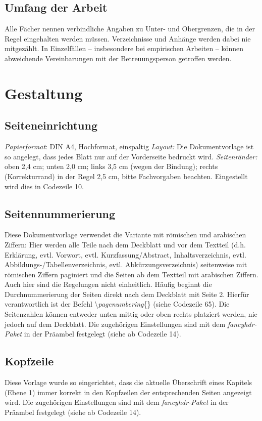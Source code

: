 \documentclass[a4paper,11pt]{article}%
\renewcommand{\\}{\vspace*{0.5\baselineskip} \newline}
\begin{document}
\subsection{Umfang der Arbeit}
Alle Fächer nennen verbindliche Angaben zu Unter- und Obergrenzen, die in der Regel eingehalten werden müssen. Verzeichnisse und Anhänge werden dabei nie mitgezählt. In Einzelfällen – insbesondere bei empirischen Arbeiten – können abweichende Vereinbarungen mit der Betreuungsperson getroffen werden.

\section{Gestaltung}
\subsection{Seiteneinrichtung}
\textit{Papierformat}: DIN A4, Hochformat, einspaltig \\
\textit{Layout:} Die Dokumentvorlage ist so angelegt, dass jedes Blatt nur auf der Vorderseite bedruckt wird. \\
\textit{Seitenränder:} oben 2,4 cm; unten 2,0 cm; links 3,5 cm (wegen der Bindung); rechts (Korrekturrand) in der Regel 2,5 cm, bitte Fachvorgaben beachten. Eingestellt wird dies in Codezeile 10.

\subsection{Seitennummerierung}
Diese Dokumentvorlage verwendet die Variante mit römischen und arabischen Ziffern: Hier werden alle Teile nach dem Deckblatt und vor dem Textteil (d.h. Erklärung, evtl. Vorwort, evtl. Kurzfassung/Abstract, Inhaltsverzeichnis, evtl. Abbildungs-/Tabellenverzeichnis, evtl. Abkürzungsverzeichnis) seitenweise mit römischen Ziffern paginiert und die Seiten ab dem Textteil mit arabischen Ziffern.\\
Auch hier sind die Regelungen nicht einheitlich. Häufig beginnt die Durchnummerierung der Seiten direkt nach dem Deckblatt mit Seite 2. Hierfür verantwortlich ist der Befehl \textbackslash\textit{pagenumbering}\{\} (siehe Codezeile 65).\\
Die Seitenzahlen können entweder unten mittig oder oben rechts platziert werden, nie jedoch auf dem Deckblatt. Die zugehörigen Einstellungen sind mit dem \textit{fancyhdr-Paket} in der Präambel festgelegt (siehe ab Codezeile 14).

\subsection{Kopfzeile}
Diese Vorlage wurde so eingerichtet, dass die aktuelle Überschrift eines Kapitels (Ebene 1) immer korrekt in den Kopfzeilen der entsprechenden Seiten angezeigt wird. Die zugehörigen Einstellungen sind mit dem \textit{fancyhdr-Paket} in der Präambel festgelegt (siehe ab Codezeile 14).
\end{document}
